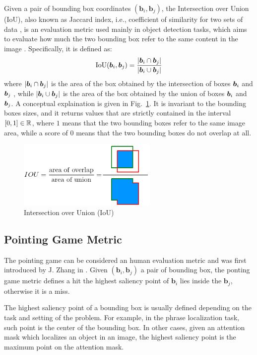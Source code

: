 Given a pair of bounding box coordinates $(\bm{b}_i , \bm{b}_j)$, the
Intersection over Union (IoU), also known as Jaccard index, i.e.,
coefficient of similarity for two sets of data
\cite{jaccard1901comparative}, is an evaluation metric used mainly in
object detection tasks, which aims to evaluate how much the two
bounding box refer to the same content in the image
\cite{rigoni2021better, padilla2020survey}. Specifically, it is
defined as:
\[
  \text{IoU}(\bm{b}_i, \bm{b}_j) = \frac{| \bm{b}_i \cap \bm{b}_j |}{| \bm{b}_i \cup \bm{b}_j |}
\]
where $| \bm{b}_i \cap \bm{b}_j |$ is the area of the box obtained by
the intersection of boxes $\bm{b}_i$ and $\bm{b}_j$ , while $| \bm{b}_i
\cup \bm{b}_j |$ is the area of the box obtained by the union of
boxes $\bm{b}_i$ and $\bm{b}_j$. A conceptual explaination is given in
Fig.~\ref{fig:iou}. It is invariant to the bounding boxes sizes, and
it returns values that are strictly contained in the interval $[0, 1]
\in \mathbb{R}$, where $1$ means that the two bounding boxes refer to the
same image area, while a score of $0$ means that the two bounding
boxes do not overlap at all.

\begin{figure}
  \centering
  \includegraphics[width=0.6\textwidth]{figures/iou.png}
  \caption[Intersection over Union (IoU)]{Intersection over Union (IoU) \cite{padilla2020survey}}
  \label{fig:iou}
\end{figure}

\subsection{Pointing Game Metric}
\label{subsec:pointing-game-metric}

The pointing game can be considered an human evaluation metric
\cite{petsiuk2018rise} and was first introduced by J. Zhang \etal{} in
\cite{zhang2018top}. Given $(\bm{b}_i , \bm{b}_j)$ a pair of bounding
box, the ponting game metric defines a hit the highest saliency point
of $\bm{b}_i$ lies inside the $\bm{b}_j$, otherwise it is a miss.

The highest saliency point of a bounding box is usually defined
depending on the task and setting of the problem. For example, in the
phrase localization task, such point is the center of the bounding
box. In other cases, given an attention mask which localizes an object
in an image, the highest saliency point is the maximum point on the
attention mask.

